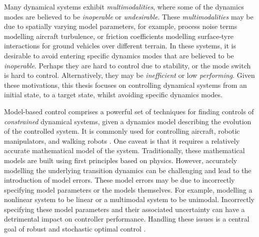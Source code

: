 \documentclass{mimosis-class/mimosis}
\numberwithin{equation}{chapter}
\begin{document}
Many dynamical systems exhibit \emph{multimodalities}, where some of the dynamics modes
are believed to be \emph{inoperable} or \emph{undesirable}.
These \emph{multimodalities} may be due to spatially varying model parameters, for example,
process noise terms modelling aircraft turbulence, or friction coefficients modelling
surface-tyre interactions for ground vehicles over different terrain.
In these systems, it is desirable to avoid entering specific dynamics modes that are believed to be \emph{inoperable}.
Perhaps they are hard to control due to stability, or the mode switch is hard to control.
Alternatively, they may be \emph{inefficient} or low \emph{performing}.
Given these motivations, this thesis focuses on controlling dynamical systems from an initial state,
to a target state, whilst avoiding specific dynamics modes.

Model-based control comprises a powerful set of techniques for finding controls of \emph{constrained} dynamical
systems, given a dynamics model describing the evolution of the controlled system.
It is commonly used for controlling aircraft, robotic manipulators, and walking
robots \citep{vonstrykDirect1992,bettsSurvey1998,gargUnified2010}.
One caveat is that it requires a relatively accurate mathematical model of the system.
Traditionally, these mathematical models are built using first principles based on physics.
However, accurately modelling the underlying transition dynamics can be challenging and
lead to the introduction of model errors.
These model errors may be due to incorrectly specifying model parameters or the
models themselves.
For example, modelling a nonlinear system to be linear or a multimodal system to be unimodal.
Incorrectly specifying these model parameters and their associated uncertainty
can have a detrimental impact on controller performance.
Handling these issues is a central goal of robust and stochastic optimal
control \citep{freemanRobust1996,stengelStochastic1986}.
\end{document}
